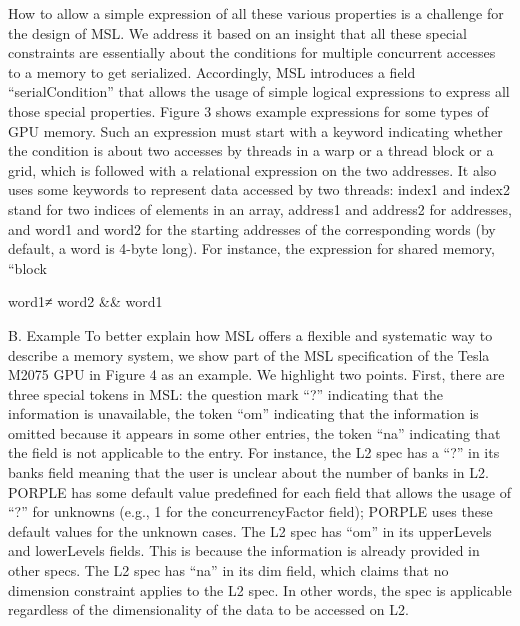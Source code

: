 \documentclass{sig-alternate}
\begin{document}
How to allow a simple expression of all these various properties is a challenge for the design of MSL. We address it based on an insight that all these special constraints are essentially about the conditions for multiple concurrent accesses to a memory to get serialized. Accordingly, MSL introduces a field “serialCondition” that allows the usage of simple logical expressions to express all those special properties. Figure 3 shows example expressions for some types of GPU memory. Such an expression must start with a keyword indicating whether the condition is about two accesses by threads in a warp or a thread block or a grid, which is followed with a relational expression on the two addresses. It also uses some keywords to represent data accessed by two threads: index1 and index2 stand for two indices of elements in an array, address1 and address2 for addresses, and word1 and word2 for the starting addresses of the corresponding words (by default, a word is 4-byte long). For instance, the expression for shared memory, “block{word1≠ word2 && word1 %

B. Example
To better explain how MSL offers a flexible and systematic way to describe a memory system, we show part of the MSL specification of the Tesla M2075 GPU in Figure 4 as an example. We highlight two points. First, there are three special tokens in MSL: the question mark “?” indicating that the information is unavailable, the token “om” indicating that the information is omitted because it appears in some other entries, the token “na” indicating that the field is not applicable to the entry. For instance, the L2 spec has a “?” in its banks field meaning that the user is unclear about the number of banks in L2. PORPLE has some default value predefined for each field that allows the usage of “?” for unknowns (e.g., 1 for the concurrencyFactor field); PORPLE uses these default values for the unknown cases. The L2 spec has “om” in its upperLevels and lowerLevels fields. This is because the information is already provided in other specs. The L2 spec has “na” in its dim field, which claims that no dimension constraint applies to the L2 spec. In other words, the spec is applicable regardless of the dimensionality of the data to be accessed on L2.

}
\end{document}
